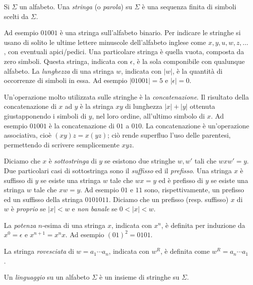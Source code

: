 \documentclass[runningheads,a4paper]{llncs}
\begin{document}
\begin{definition}[Stringa]
Si $\Sigma$ un alfabeto. Una \emph{stringa} (o \emph{parola}) su $\Sigma$ \`{e} una sequenza finita di simboli scelti da $\Sigma$.
\end{definition}

Ad esempio $01001$ \`{e} una stringa sull'alfabeto binario. Per indicare le stringhe si usano di solito le ultime lettere minuscole dell'alfabeto inglese come $x,y,u,w,z,\ldots$, con eventuali apici/pedici. Una particolare stringa \`{e} quella vuota, composta da zero simboli. Questa stringa, indicata con $\epsilon$, \`{e} la sola componibile con qualunque alfabeto. La \emph{lunghezza} di una stringa $w$, indicata con $|w|$, \`{e} la quantit\`{a} di occorrenze di simboli in essa. Ad esempio $|01001| = 5$ e $|\epsilon| = 0$.

Un'operazione molto utilizzata sulle stringhe \`{e} la \emph{concatenazione}. Il risultato della concatenazione di $x$ ad $y$ \`{e} la stringa $xy$ di lunghezza $|x|+|y|$ ottenuta giustapponendo i simboli di $y$, nel loro ordine, all'ultimo simbolo di $x$. Ad esempio $01001$ \`{e} la concatenazione di $01$ a $010$. La concatenazione \`{e} un'operazione associativa, cio\`{e} $(xy)z = x(yz)$; ci\`{o} rende superfluo l'uso delle parentesi, permettendo di scrivere semplicemente $xyz$.

Diciamo che $x$ \`{e} \emph{sottostringa} di $y$ se esistono due stringhe $w,w'$ tali che $wxw' = y$. Due particolari casi di sottostringa sono il \emph{suffisso} ed il \emph{prefisso}. Una stringa $x$ \`{e} suffisso di $y$ se esiste una stringa $w$ tale che $wx = y$ ed \`{e} prefisso di $y$ se esiste una stringa $w$ tale che $xw = y$. Ad esempio $01$ e $11$ sono, rispettivamente, un prefisso ed un suffisso della stringa $0101011$. Diciamo che un prefisso (resp. suffisso) $x$ di $w$ \`{e} \emph{proprio} se $|x| < w$ e \emph{non banale} se $0 < |x| < w$.

La \emph{potenza} $n$-esima di una stringa $x$, indicata con $x^n$, \`{e} definita per induzione da $x^0 = \epsilon$ e $x^{n+1} = x^nx$. Ad esempio $(01)^2 = 0101$.

La stringa \emph{rovesciata} di $w = a_1\cdots a_n$, indicata con $w^R$, \`{e} definita come $w^R = a_n\cdots a_1$.

\begin{definition}[Linguaggio]
Un \emph{linguaggio} su un alfabeto $\Sigma$ \`{e} un insieme di stringhe su $\Sigma$. 
\end{definition}
\end{document}
